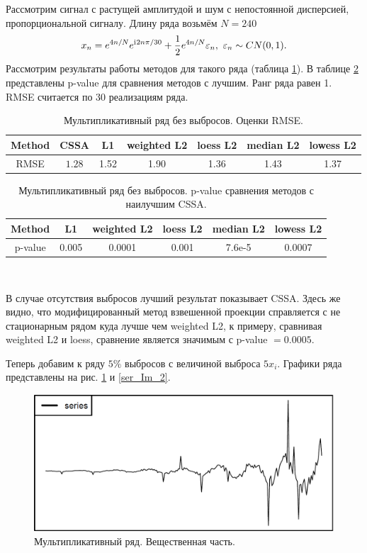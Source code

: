 \documentclass[specialist,
               substylefile = spbu.rtx,
               subf,href,colorlinks=true, 12pt]{disser}
\begin{document}
Рассмотрим сигнал с растущей амплитудой и шум с непостоянной дисперсией, пропорциональной сигналу.
Длину ряда возьмём $N = 240$
$$x_n = e^{4n/N} e^{\mathrm{i}\mkern1mu 2n\pi/30} + \frac{1}{2}e^{4n/N} \varepsilon_n, ~ \varepsilon_n \sim CN(0,1).$$
Рассмотрим результаты работы методов для такого ряда (таблица \ref{tab3}).  В таблице \ref{tab: pval3} представлены p-value для сравнения методов с лучшим. Ранг ряда равен 1. RMSE считается по 30 реализациям ряда.

\begin{table}[H]
	\begin{center}
		\caption{Мультипликативный ряд без выбросов. Оценки RMSE.}
		\label{tab3}
		\begin{tabular}{|c|c|c|c|c|c|c|}
			\hline
			Method 	& CSSA & L1 & weighted L2 & loess L2 & median L2 & lowess L2 \\
			\hline
			RMSE & $\mathbf{1.28}$  & 1.52  & 1.90 & 1.36 & 1.43 & 1.37\\
			\hline
		\end{tabular}
	\end{center}
\end{table}

\begin{table}[H]
	\caption{Мультипликативный ряд без выбросов. p-value сравнения методов с наилучшим CSSA.}
	\label{tab: pval3}
	\begin{center}
		\begin{tabular}{|c|c|c|c|c|c|}
			\hline
			Method & L1 & weighted L2 & loess L2 & median L2 & lowess L2  \\
			\hline
			p-value & 0.005   & 0.0001 & 0.001  & 7.6e-5 & 0.0007  \\
			\hline
		\end{tabular} \\
	\end{center}
\end{table}

В случае отсутствия выбросов лучший результат показывает CSSA. Здесь же видно, что модифицированный метод взвешенной проекции справляется с не стационарным рядом куда лучше чем weighted L2, к примеру, сравнивая weighted L2 и loess, сравнение является значимым с p-value $ = 0.0005$.

Теперь добавим к ряду $5\%$ выбросов с величиной выброса $5x_i$. Графики ряда представлены на рис. \ref{ser_Re_2} и \ref{ser_Im_2}.

\begin{figure}[H]
	\begin{center}
		\includegraphics[width=0.67\linewidth]{img/ser_2_Re.png}
		\caption{Мультипликативный ряд. Вещественная часть.}
		\label{ser_Re_2}
	\end{center}
\end{figure}
\end{document}
